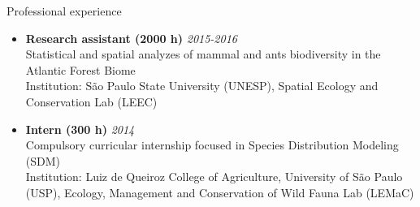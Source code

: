 \documentclass{resume}
\begin{document}

\begin{rSection}{Professional experience}
\begin{itemize}
\item {\bf Research assistant (2000 h)} \hfill{\em 2015-2016} 
\\ Statistical and spatial analyzes of mammal and ants biodiversity in the Atlantic Forest Biome
\\ Institution: São Paulo State University (UNESP), Spatial Ecology and Conservation Lab (LEEC)

\item {\bf Intern (300 h)} \hfill{\em 2014} 
\\ Compulsory curricular internship focused in Species Distribution Modeling (SDM)
\\ Institution: Luiz de Queiroz College of Agriculture, University of São Paulo (USP), Ecology, Management and Conservation of Wild Fauna Lab (LEMaC)
\end{itemize}
\end{rSection}

\end{document}
